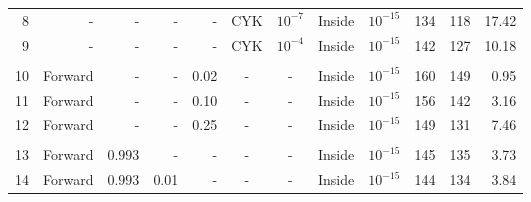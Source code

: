 \begin{tabular}{r|r|rr|r|cc|cc|c|c|r}
8 & - & -      &    - &    -             & CYK & $10^{-7}$   & Inside    & $10^{-15}$                         & 134     & 118    &  17.42\\ %
9 & - & -      &    - &    -             & CYK & $10^{-4}$   & Inside    & $10^{-15}$                         & 142     & 127    &  10.18\\ %
& & & & & & & & & & & \\
10 & Forward & - & - & 0.02             & - & -           & Inside    & $10^{-15}$                          & 160     & 149    &  0.95\\ %
11 & Forward & - & - & 0.10             & - & -           & Inside    & $10^{-15}$                          & 156     & 142    &  3.16 \\ %
12 & Forward & - & - & 0.25             & - & -           & Inside    & $10^{-15}$                          & 149     & 131    &  7.46 \\ %
& & & & & & & & & & & \\
13& Forward & $0.993$& -    & -              & - & -           & Inside    & $10^{-15}$                       & 145     & 135    &  3.73 \\ %
14& Forward & $0.993$& 0.01 & -              & - & -           & Inside    & $10^{-15}$                       & 144     & 134    &  3.84 \\ %

\end{tabular}
